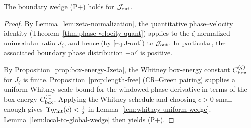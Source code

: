 \begin{theorem}\label{thm:pplus-proof-complete}
The boundary wedge \textup{(P+)} holds for \(\mathcal J_{\rm out}\).
\end{theorem}
\begin{proof}
By Lemma~\ref{lem:zeta-normalization}, the quantitative phase--velocity identity (Theorem~\ref{thm:phase-velocity-quant}) applies to the \(\zeta\)-normalized unimodular ratio \(J_\zeta\), and hence (by \eqref{eq:J-out}) to \(\mathcal J_{\rm out}\).
In particular, the associated boundary phase distribution \(-w'\) is positive.

By Proposition~\ref{prop:box-energy-Jzeta}, the Whitney box-energy constant \(C_{\rm box}^{(\zeta)}\) for \(J_\zeta\) is finite.
Proposition~\ref{prop:length-free} (CR--Green pairing) supplies a uniform Whitney-scale bound for the windowed phase derivative in terms of the box energy \(C_{\rm box}^{(\zeta)}\).
Applying the Whitney schedule and choosing \(c>0\) small enough gives \(\Upsilon_{\rm Whit}(c)<\tfrac12\) in Lemma~\ref{lem:whitney-uniform-wedge}.
Lemma~\ref{lem:local-to-global-wedge} then yields \textup{(P+)}.
\end{proof}

